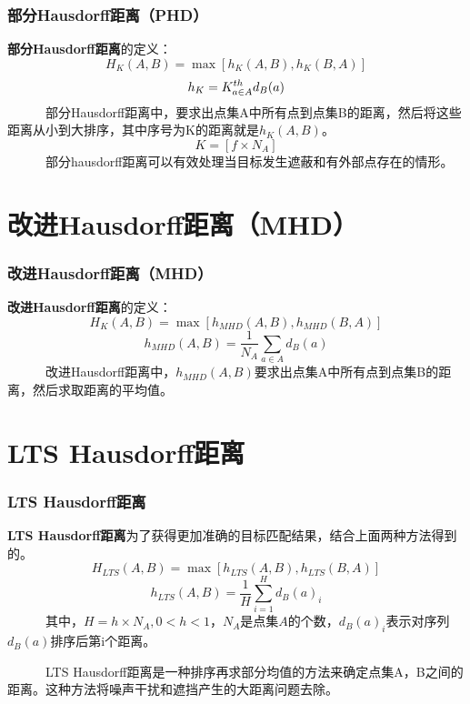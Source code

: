 \documentclass[notheorems,mathserif,table,compress]{beamer}  %
\begin{document}
\begin{frame}
\frametitle{部分Hausdorff距离（PHD）}
{\color{blue}\textbf{部分Hausdorff距离}}的定义：
\begin{displaymath}
H_{K}(A,B)=\max[h_{K}(A,B),h_{K}(B,A)]
\end{displaymath}
\begin{displaymath}
h_{K}=K^{th}_{\begin{subarray}{l}
              a\in A
               \end{subarray}}
d_{B}(a)
\end{displaymath}
~~~~~~部分Hausdorff距离中，要求出点集A中所有点到点集B的距离，然后将这些距离从小到大排序，其中序号为K的距离就是$h_{K}(A,B)$。
\begin{displaymath}
K=[f\times N_{A}]
\end{displaymath}
~~~~~~部分hausdorff距离可以有效处理当目标发生遮蔽和有外部点存在的情形。
\end{frame}

\section{改进Hausdorff距离（MHD）}   
 
\begin{frame}
\frametitle{改进Hausdorff距离（MHD）}
{\color{blue}\textbf{改进Hausdorff距离}}的定义：
\begin{displaymath}
H_{K}(A,B)=\max[h_{MHD}(A,B),h_{MHD}(B,A)]
\end{displaymath}
\begin{displaymath}
h_{MHD}(A,B)=\frac{1}{N_{A}}\sum_{a\in A} d_{B}(a)
\end{displaymath}
~~~~~~改进Hausdorff距离中，$h_{MHD}(A,B)$要求出点集A中所有点到点集B的距离，然后求取距离的平均值。
\end{frame}      

\section{LTS Hausdorff距离} 
\begin{frame}
\frametitle{LTS Hausdorff距离}
{\color{blue}\textbf{LTS Hausdorff距离}}为了获得更加准确的目标匹配结果，结合上面两种方法得到的。
\begin{displaymath}
H_{LTS}(A,B)=\max[h_{LTS}(A,B),h_{LTS}(B,A)]
\end{displaymath}
\begin{displaymath}
h_{LTS}(A,B)=\frac{1}{H}\sum_{i=1}^{H} d_{B}(a)_{i}
\end{displaymath}
~~~~~~其中，$H=h\times N_{A},0<h<1$，$N_{A}$是点集$A$的个数，$d_{B}(a)_{i}$表示对序列$d_{B}(a)$排序后第i个距离。

~~~~~~LTS Hausdorff距离是一种排序再求部分均值的方法来确定点集A，B之间的距离。这种方法将噪声干扰和遮挡产生的大距离问题去除。
\end{frame}
\end{document}
